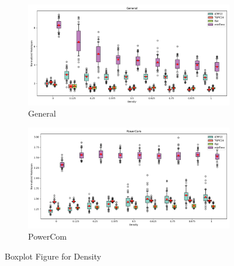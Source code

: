 \documentclass{article}
\begin{document}
\begin{figure}[htbp]
\\[2ex]
\begin{subfigure}[b]{0.32\textwidth}\includegraphics[width=\textwidth]{Results/Density/Density_General_boxplot}\caption{General}\label{fig:boxplot_figures_Density_General}\end{subfigure}
\hfill
\begin{subfigure}[b]{0.32\textwidth}\includegraphics[width=\textwidth]{Results/Density/Density_PowerCom_boxplot}\caption{PowerCom}\label{fig:boxplot_figures_Density_PowerCom}\end{subfigure}
\hfill
\caption{Boxplot Figure for Density}
\label{fig:boxplot_figures_Density}
\end{figure}
\end{document}
